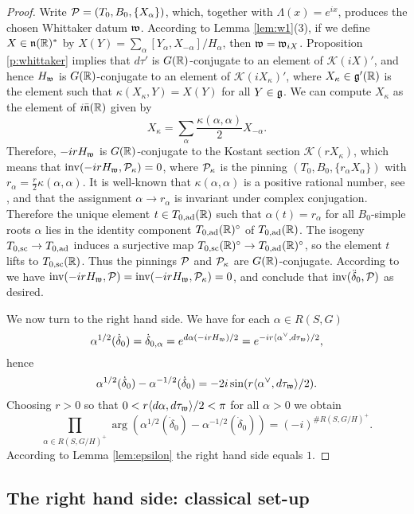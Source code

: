 \documentclass{article}
\theoremstyle{definition}
\numberwithin{equation}{section}
\renewcommand{\-}{\hyp{}}
\newcommand{\K}{\mathcal K}
\begin{document}
\begin{proof}
Write $\mathcal{P}=(T_0,B_0,\{X_\alpha\})$, which, together with $\Lambda(x)=e^{ix}$, produces the chosen Whittaker datum $\mathfrak{w}$. According to Lemma \ref{lem:w1}(3), if we define $X \in \mathfrak{n}(\mathbb{R})^*$ by $X(Y) = \sum_\alpha [Y_\alpha,X_{-\alpha}]/H_\alpha$, then $\mathfrak{w}=\mathfrak{w}_{iX}$. Proposition \ref{p:whittaker} implies that $d\tau'$ is $G(\mathbb{R})$-conjugate to an element of $\K(iX)'$, and hence $H_{\mathfrak{w}}$ is $G(\mathbb{R})$-conjugate to an element of $\K(iX_\kappa)'$, where $X_\kappa \in \mathfrak{g}'(\mathbb{R})$ is the element such that $\kappa(X_\kappa,Y)=X(Y)$ for all $Y \in \mathfrak{g}$. We can compute $X_\kappa$ as the element of $i\mathfrak{\bar n}(\mathbb{R})$ given by
\[ X_\kappa = \sum_\alpha \frac{\kappa(\alpha,\alpha)}{2} X_{-\alpha}. \]
Therefore, $-irH_{\mathfrak{w}}$ is $G(\mathbb{R})$-conjugate to the Kostant section $\K(rX_\kappa)$, which means that $\textrm{inv}(-irH_{\mathfrak{w}},\mathcal{P}_\kappa)=0$, where $\mathcal{P}_\kappa$ is the pinning $(T_0,B_0,\{r_\alpha X_\alpha\})$ with $r_\alpha = \tfrac{r}{2}\kappa(\alpha,\alpha)$. It is well-known that $\kappa(\alpha,\alpha)$ is a positive rational number, see \cite[\S8.5]{Humphreys80}, and that the assignment $\alpha \to r_\alpha$ is invariant under complex conjugation. Therefore the unique element  $t \in T_{0,\textrm{ad}}(\mathbb{R})$ such that $\alpha(t)=r_\alpha$ for all $B_0$-simple roots $\alpha$ lies in the identity component $T_{0,\textrm{ad}}(\mathbb{R})^\circ$ of $T_{0,\textrm{ad}}(\mathbb{R})$. The isogeny $T_{0,\textrm{sc}} \to T_{0,\textrm{ad}}$ induces a surjective map $T_{0,\textrm{sc}}(\mathbb{R})^\circ \to T_{0,\textrm{ad}}(\mathbb{R})^\circ$, so the element $t$ lifts to $T_{0,\textrm{sc}}(\mathbb{R})$. Thus the pinnings $\mathcal{P}$ and $\mathcal{P}_\kappa$ are $G(\mathbb{R})$-conjugate. According to \cite[Lemma 4.1.4]{KalHDC} we have $\textrm{inv}(-irH_{\mathfrak{w}},\mathcal{P})=\textrm{inv}(-irH_{\mathfrak{w}},\mathcal{P}_\kappa)=0$, and conclude that $\textrm{inv}(\ddot\delta_0,\mathcal{P})$ as desired.

We now turn to the right hand side. We have for each $\alpha \in R(S,G)$
\[ \alpha^{1/2}(\dot\delta_0)=\dot\delta_{0,\alpha} = e^{d\alpha(-irH_{\mathfrak{w}})/2}=e^{-ir\langle\alpha^\vee,d\tau_{\mathfrak{w}}\rangle/2},\]
hence
\[ \alpha^{1/2}(\dot\delta_0)-\alpha^{-1/2}(\dot\delta_0) = -2i\sin(r\langle\alpha^\vee,d\tau_{\mathfrak{w}}\rangle/2). \]
Choosing $r>0$ so that $0<r\langle d\alpha,d\tau_{\mathfrak{w}}\rangle/2 < \pi$ for all $\alpha>0$ we obtain
\[ \prod_{\alpha \in R(S,G/H)^+}\arg(\alpha^{1/2}(\dot\delta_0) - \alpha^{-1/2}(\dot\delta_0)) = (-i)^{\#R(S,G/H)^+}. \]
According to Lemma \ref{lem:epsilon} the right hand side equals $1$.
\end{proof}

\subsection{The right hand side: classical set-up}
\end{document}
